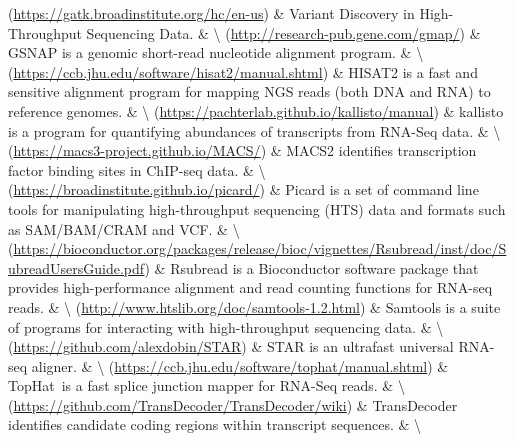 \documentclass[14pt,]{article}
\begin{document}
\hline
[GATK](\url{https://gatk.broadinstitute.org/hc/en-us}) \& Variant Discovery in High-Throughput Sequencing Data. \& \textbackslash{}
\hline
[Gsnap](\url{http://research-pub.gene.com/gmap/}) \& GSNAP is a genomic short-read nucleotide alignment program. \& \textbackslash{}
\hline
[Hisat2](\url{https://ccb.jhu.edu/software/hisat2/manual.shtml}) \& HISAT2 is a fast and sensitive alignment program for mapping NGS reads (both DNA and RNA) to reference genomes. \& \textbackslash{}
\hline
[Kallisto](\url{https://pachterlab.github.io/kallisto/manual}) \& kallisto is a program for quantifying abundances of transcripts from RNA-Seq data. \& \textbackslash{}
\hline
[MACS2](\url{https://macs3-project.github.io/MACS/}) \& MACS2 identifies transcription factor binding sites in ChIP-seq data. \& \textbackslash{}
\hline
[Picard](\url{https://broadinstitute.github.io/picard/}) \& Picard is a set of command line tools for manipulating high-throughput sequencing (HTS) data and formats such as SAM/BAM/CRAM and VCF. \& \textbackslash{}
\hline
[Rsubread](\url{https://bioconductor.org/packages/release/bioc/vignettes/Rsubread/inst/doc/SubreadUsersGuide.pdf}) \& Rsubread is a Bioconductor software package that provides high-performance alignment and read counting functions for RNA-seq reads. \& \textbackslash{}
\hline
[Samtools](\url{http://www.htslib.org/doc/samtools-1.2.html}) \& Samtools is a suite of programs for interacting with high-throughput sequencing data. \& \textbackslash{}
\hline
[STAR](\url{https://github.com/alexdobin/STAR}) \& STAR is an ultrafast universal RNA-seq aligner. \& \textbackslash{}
\hline
[Tophat2](\url{https://ccb.jhu.edu/software/tophat/manual.shtml}) \& TopHat~is a fast splice junction mapper for RNA-Seq reads. \& \textbackslash{}
\hline
[TransDecoder](\url{https://github.com/TransDecoder/TransDecoder/wiki}) \& TransDecoder identifies candidate coding regions within transcript sequences. \& \textbackslash{}
\end{document}
